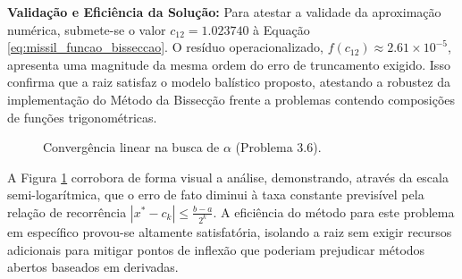 \textbf{Validação e Eficiência da Solução:}
Para atestar a validade da aproximação numérica, submete-se o valor $c_{12} = 1.023740$ à Equação \ref{eq:missil_funcao_bisseccao}. O resíduo operacionalizado, $f(c_{12}) \approx 2.61 \times 10^{-5}$, apresenta uma magnitude da mesma ordem do erro de truncamento exigido. Isso confirma que a raiz satisfaz o modelo balístico proposto, atestando a robustez da implementação do Método da Bissecção frente a problemas contendo composições de funções trigonométricas. 

\begin{figure}[H]
    \centering
    \caption{Convergência linear na busca de $\alpha$ (Problema 3.6).}
    \label{fig:convergencia_bisseccao_missil}
\end{figure}

A Figura \ref{fig:convergencia_bisseccao_missil} corrobora de forma visual a análise, demonstrando, através da escala semi-logarítmica, que o erro de fato diminui à taxa constante previsível pela relação de recorrência $|x^* - c_k| \leq \frac{b-a}{2^k}$. A eficiência do método para este problema em específico provou-se altamente satisfatória, isolando a raiz sem exigir recursos adicionais para mitigar pontos de inflexão que poderiam prejudicar métodos abertos baseados em derivadas.


